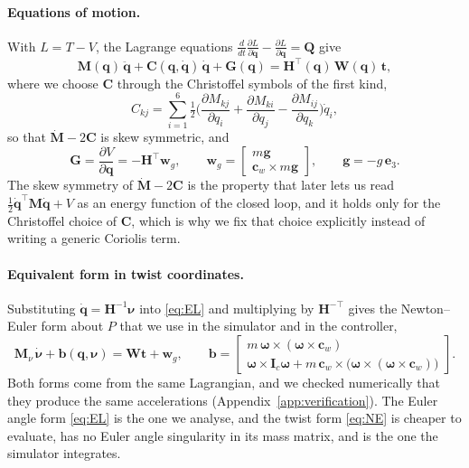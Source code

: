 \documentclass[10pt]{article}
\newcommand{\vc}[1]{\bm{#1}}
\newcommand{\mt}[1]{\mathbf{#1}}
\begin{document}
\paragraph{Equations of motion.} With $L=T-V$, the Lagrange equations $\frac{d}{dt}\frac{\partial L}{\partial\dot{\vc q}}-\frac{\partial L}{\partial\vc q}=\vc Q$ give
\begin{equation}\label{eq:EL}
\mt M(\vc q)\,\ddot{\vc q}+\mt C(\vc q,\dot{\vc q})\,\dot{\vc q}+\vc G(\vc q)=\mt H^\top(\vc q)\,\mt W(\vc q)\,\vc t ,
\end{equation}
where we choose $\mt C$ through the Christoffel symbols of the first kind,
\begin{equation}\label{eq:C}
C_{kj}=\sum_{i=1}^{6}\tfrac12\Big(\frac{\partial M_{kj}}{\partial q_i}+\frac{\partial M_{ki}}{\partial q_j}-\frac{\partial M_{ij}}{\partial q_k}\Big)\dot q_i ,
\end{equation}
so that $\dot{\mt M}-2\mt C$ is skew symmetric, and
\begin{equation}\label{eq:G}
\vc G=\frac{\partial V}{\partial\vc q}=-\mt H^\top\vc w_g,\qquad
\vc w_g=\begin{bmatrix} m\vc g\\ \vc c_w\times m\vc g\end{bmatrix},\qquad \vc g=-g\,\vc e_3 .
\end{equation}
The skew symmetry of $\dot{\mt M}-2\mt C$ is the property that later lets us read $\tfrac12\dot{\vc q}^\top\mt M\dot{\vc q}+V$ as an energy function of the closed loop, and it holds only for the Christoffel choice of $\mt C$, which is why we fix that choice explicitly instead of writing a generic Coriolis term.

\paragraph{Equivalent form in twist coordinates.} Substituting $\dot{\vc q}=\mt H^{-1}\vc\nu$ into \eqref{eq:EL} and multiplying by $\mt H^{-\top}$ gives the Newton--Euler form about $P$ that we use in the simulator and in the controller,
\begin{equation}\label{eq:NE}
\mt M_\nu\,\dot{\vc\nu}+\vc b(\vc q,\vc\nu)=\mt W\vc t+\vc w_g,\qquad
\vc b=\begin{bmatrix} m\,\vc\omega\times(\vc\omega\times\vc c_w)\\ \vc\omega\times\mt I_c\vc\omega+m\,\vc c_w\times\big(\vc\omega\times(\vc\omega\times\vc c_w)\big)\end{bmatrix}.
\end{equation}
Both forms come from the same Lagrangian, and we checked numerically that they produce the same accelerations (Appendix~\ref{app:verification}). The Euler angle form \eqref{eq:EL} is the one we analyse, and the twist form \eqref{eq:NE} is cheaper to evaluate, has no Euler angle singularity in its mass matrix, and is the one the simulator integrates.
\end{document}
